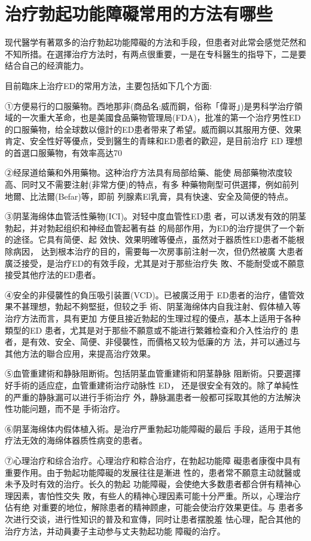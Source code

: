 \documentclass[12pt,UTF8]{ctexbook}
\begin{document}
\section{治疗勃起功能障礙常用的方法有哪些}

现代醫学有著眾多的治疗勃起功能障礙的方法和手段，但患者对此常会感觉茫然和不知所措。在選擇治疗方法时，有两点很重要，一是在专科醫生的指导下，二是要结合自己的经濟能力。

目前臨床上治疗ED的常用方法，主要包括如下几个方面:

①方便易行的口服藥物。西地那非(商品名:威而鋼，俗称「偉哥」)是男科学治疗領域的一次重大革命，也是美國食品藥物管理局(FDA)，批准的第一个治疗男性ED的口服藥物，给全球数以億計的ED患者带来了希望。威而鋼以其服用方便、效果肯定、安全性好等優点，受到醫生的青睐和ED患者的歡迎，是目前治疗 ED 理想的首選口服藥物，有效率高达70%

②经尿道给藥和外用藥物。这种治疗方法具有局部给藥、能使
局部藥物浓度较高、同时又不需要注射(非常方便)的特点，有多
种藥物劑型可供選擇，例如前列地爾、比法爾(Befar)等，即前
列腺素El乳膏，具有快速、安全及简便的特点。

③阴茎海绵体血管活性藥物(ICI)。对轻中度血管性ED患
者，可以诱发有效的阴茎勃起，并对勃起组织和神经血管起著有益
的局部作用，为ED的治疗提供了一个新的途径。它具有简便、起
效快、效果明確等優点，虽然对于器质性ED患者不能根除病因，
达到根本治疗的目的，需要每一次房事前注射一次，但仍然被廣
大患者廣泛接受，是治疗ED的有效手段，尤其是对于那些治疗失
敗、不能耐受或不願意接受其他疗法的ED患者。

④安全的非侵襲性的負压吸引装置(VCD)。已被廣泛用于
ED患者的治疗，儘管效果不甚理想，勃起不夠堅挺，但较之手
術、阴茎海绵体内自我注射、假体植入等治疗方法而言，具有更加
方便且接近勃起的生理过程的優点，基本上适用于各种類型的ED
患者，尤其是对于那些不願意或不能进行繁雜检查和介入性治疗的
患者，是有效、安全、简便、非侵襲性，而價格又较为低廉的方
法，并可以通过与其他方法的聯合应用，来提高治疗效果。

⑤血管重建術和静脉阻断術。包括阴茎血管重建術和阴茎静脉
阻断術。只要選擇好手術的适应症，血管重建術治疗动脉性 ED，
还是很安全有效的。除了单純性的严重的静脉漏可以进行手術治疗
外，静脉漏患者一般都可採取其他的方法解決性功能问題，而不是
手術治疗。

⑥阴茎海绵体内假体植入術。是治疗严重勃起功能障礙的最后
手段，适用于其他疗法无效的海绵体器质性病变的患者。

⑦心理治疗和综合治疗。心理治疗和粽合治疗，在勃起功能障
礙患者康復中具有重要作用。由于勃起功能障礙的发展往往是漸进
性的，患者常不願意主动就醫或未予及时有效的治疗。长久的勃起
功能障礙，会使绝大多数患者都合併有精神心理因素，害怕性交失
敗，有些人的精神心理因素可能十分严重。所以，心理治疗佔有绝
对重要的地位，解除患者的精神顾慮，可能会使治疗效果更佳。与
患者多次进行交谈，进行性知识的普及和宣傳，同时让患者摆脫羞
怯心理，配合其他的治疗方法，并动員妻子主动参与丈夫勃起功能
障礙的治疗。
\end{document}
